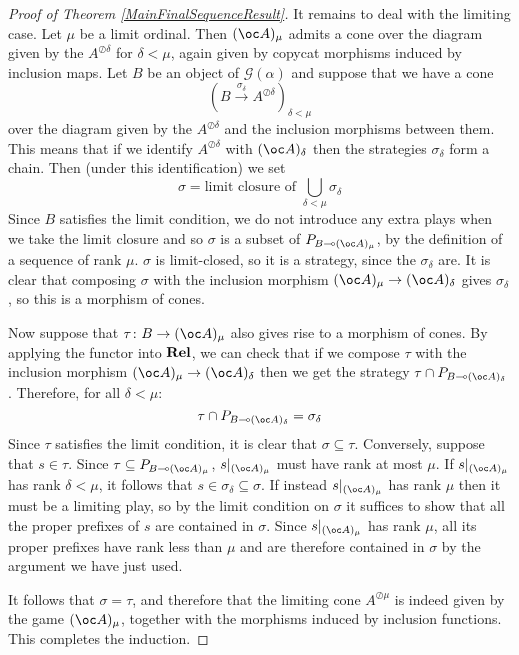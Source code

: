\documentclass[11pt]{article} %
\theoremstyle{plain} %
\theoremstyle{definition} %
\theoremstyle{note}
\theoremstyle{exercisestyle}
\newcommand{\catname}[1]{{\normalfont\textbf{#1}}}
\newcommand{\Rel}{\catname{Rel}}
\newcommand{\map}[3]{#2\xrightarrow{#1} #3}
\newcommand*\from{\colon}
\newcommand{\sequoid}{\oslash}
\renewcommand{\implies}{\multimap}
\newcommand{\G}{\mathcal G}
\renewcommand{\subset}{\subseteq}
\begin{document}
\begin{proof}[Proof of Theorem \ref{MainFinalSequenceResult}]
  It remains to deal with the limiting case.  Let $\mu$ be a limit ordinal.  Then $(\oc A)_\mu$ admits a cone over the diagram given by the $A^{\sequoid \delta}$ for $\delta<\mu$, again given by copycat morphisms induced by inclusion maps.  Let $B$ be an object of $\G(\alpha)$ and suppose that we have a cone
  \[
    \left(\map{\sigma_\delta}{B}{A^{\sequoid\delta}}\right)_{\delta<\mu}
    \]
  over the diagram given by the $A^{\sequoid\delta}$ and the inclusion morphisms between them.  This means that if we identify $A^{\sequoid\delta}$ with $(\oc A)_\delta$ then the strategies $\sigma_\delta$ form a chain.  Then (under this identification) we set
  \[
    \sigma = \textrm{limit closure of }\bigcup_{\delta<\mu}\sigma_\delta
    \]
  Since $B$ satisfies the limit condition, we do not introduce any extra plays when we take the limit closure and so $\sigma$ is a subset of $P_{B\implies (\oc A)_\mu}$, by the definition of a sequence of rank $\mu$.  $\sigma$ is limit-closed, so it is a strategy, since the $\sigma_\delta$ are.  It is clear that composing $\sigma$ with the inclusion morphism $(\oc A)_\mu\to(\oc A)_\delta$ gives $\sigma_\delta$, so this is a morphism of cones.  

  Now suppose that $\tau\from B\to(\oc A)_\mu$ also gives rise to a morphism of cones.  By applying the functor into $\Rel$, we can check that if we compose $\tau$ with the inclusion morphism $(\oc A)_\mu\to(\oc A)_\delta$ then we get the strategy $\tau\cap P_{B\implies(\oc A)_\delta}$.  Therefore, for all $\delta<\mu$:
  \[
    \tau \cap P_{B\implies(\oc A)_\delta}=\sigma_\delta
    \]
  Since $\tau$ satisfies the limit condition, it is clear that $\sigma\subset\tau$.  Conversely, suppose that $s\in\tau$.  Since $\tau\subset P_{B\implies(\oc A)_\mu}$, $s\vert_{(\oc A)_\mu}$ must have rank at most $\mu$.  If $s\vert_{(\oc A)_\mu}$ has rank $\delta<\mu$, it follows that $s\in\sigma_\delta\subset\sigma$.  If instead $s\vert_{(\oc A)_\mu}$ has rank $\mu$ then it must be a limiting play, so by the limit condition on $\sigma$ it suffices to show that all the proper prefixes of $s$ are contained in $\sigma$.  Since $s\vert_{(\oc A)_\mu}$ has rank $\mu$, all its proper prefixes have rank less than $\mu$ and are therefore contained in $\sigma$ by the argument we have just used.  

  It follows that $\sigma=\tau$, and therefore that the limiting cone $A^{\sequoid\mu}$ is indeed given by the game $(\oc A)_\mu$, together with the morphisms induced by inclusion functions.  This completes the induction.  
\end{proof}
\end{document}
